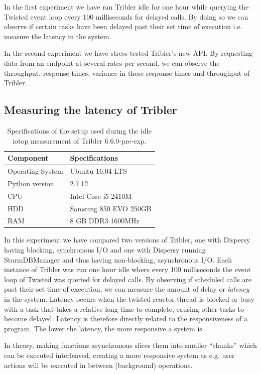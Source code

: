 In the first experiment we have ran Tribler idle for one hour while querying the Twisted event loop every 100 milliseconds for delayed calls.
By doing so we can observe if certain tasks have been delayed past their set time of execution i.e. measure the latency in the system.

In the second experiment we have stress-tested Tribler's new API.
By requesting data from an endpoint at several rates per second, we can observe the throughput, response times, variance in these response times and throughput of Tribler.

\subsection{Measuring the latency of Tribler}

\begin{table}[h]
	\centering
	\begin{tabular}{l|l}
		\textbf{Component} 	& \textbf{Specifications} \\ \hline
		Operating System   	& Ubuntu 16.04 LTS \\
		Python version		& 2.7.12 \\
		CPU					& Intel Core i5-2410M \\ 
		HDD					& Samsung 850 EVO 250GB  \\ 
		RAM					& 8 GB DDR3 1600MHz \\
	\end{tabular}
	\caption{Specifications of the setup used during the idle iotop measurement of Tribler 6.6.0-pre-exp.}
	\label{table:tribler_idle}
\end{table}

In this experiment we have compared two versions of Tribler, one with Dispersy having  blocking, synchronous I/O and one with Dispersy running StormDBManager and thus having non-blocking, asynchronous I/O.
Each instance of Tribler was run one hour idle where every 100 milliseconds the event loop of Twisted was queried for delayed calls.
By observing if scheduled calls are past their set time of execution, we can measure the amount of delay or \emph{latency} in the system.
Latency occurs when the twisted reactor thread is blocked or busy with a task that takes a relative long time to complete, causing other tasks to become delayed.
Latency is therefore directly related to the responsiveness of a program.
The lower the latency, the more responsive a system is.

In theory, making functions asynchronous slices them into smaller \enquote{chunks} which can be executed interleaved, creating a more responsive system as e.g. user actions will be executed in between (background) operations.

